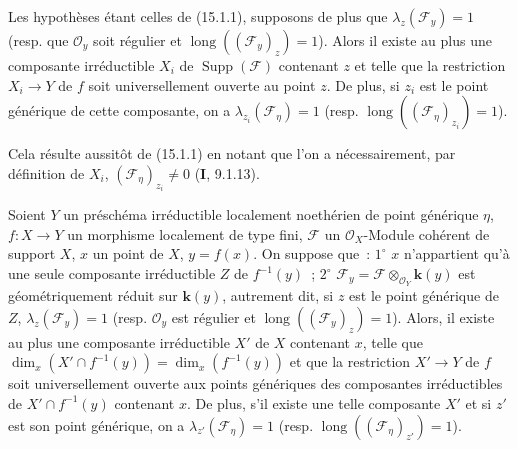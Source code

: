 \begin{corollary}[15.1.2]
\label{IV.15.1.2-fr}
Les hypothèses étant celles de (15.1.1), supposons de plus que
$\lambda_z(\mathcal F_y)=1$ (resp. que $\mathcal O_y$ soit régulier et
$\operatorname{long}((\mathcal F_y)_z)=1$). Alors il existe au plus une composante
irréductible $X_i$ de $\operatorname{Supp}(\mathcal F)$ contenant $z$ et telle que
la restriction $X_i\to Y$ de $f$ soit universellement ouverte au point $z$. De
plus, si $z_i$ est le point générique de cette composante, on a
$\lambda_{z_i}(\mathcal F_\eta)=1$ (resp.
$\operatorname{long}((\mathcal F_\eta)_{z_i})=1$).
\end{corollary}

Cela résulte aussitôt de (15.1.1) en notant que l'on a nécessairement, par
définition de $X_i$, $(\mathcal F_\eta)_{z_i}\ne0$ (\textbf{I}, 9.1.13).

\begin{corollary}[15.1.3]
\label{IV.15.1.3-fr}
Soient $Y$ un préschéma irréductible localement noethérien de point générique
$\eta$, $f:X\to Y$ un morphisme localement de type fini, $\mathcal F$ un
$\mathcal O_X$-Module cohérent de support $X$, $x$ un point de $X$, $y=f(x)$. On
suppose que~: $1^\circ$ $x$ n'appartient qu'à une seule composante irréductible
$Z$ de $f^{-1}(y)$~; $2^\circ$
$\mathcal F_y=\mathcal F\otimes_{\mathcal O_Y}\mathbf{k}(y)$ est géométriquement
réduit sur $\mathbf{k}(y)$, autrement dit, si $z$ est le point générique de $Z$,
$\lambda_z(\mathcal F_y)=1$ (resp. $\mathcal O_y$ est régulier et
$\operatorname{long}((\mathcal F_y)_z)=1$). Alors, il existe au plus une
composante irréductible $X'$ de $X$ contenant $x$, telle que
$\dim_x(X'\cap f^{-1}(y))=\dim_x(f^{-1}(y))$ et que la restriction $X'\to Y$ de
$f$ soit universellement ouverte aux points génériques des composantes
irréductibles de $X'\cap f^{-1}(y)$ contenant $x$. De plus, s'il existe une telle
composante $X'$ et si $z'$ est son point générique, on a
$\lambda_{z'}(\mathcal F_\eta)=1$ (resp.
$\operatorname{long}((\mathcal F_\eta)_{z'})=1$).
\end{corollary}

